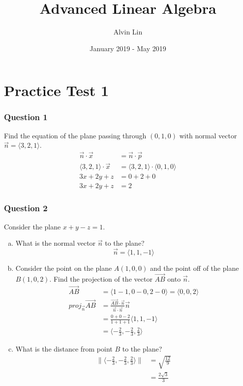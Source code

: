 \documentclass{math}
\title{Advanced Linear Algebra}
\author{Alvin Lin}
\date{January 2019 - May 2019}
\begin{document}
\maketitle

\section*{Practice Test 1}

\subsubsection*{Question 1}
Find the equation of the plane passing through \( (0, 1, 0) \) with normal
vector \( \vec{n} = \langle3,2,1\rangle \).
\begin{align*}
  \vec{n}\cdot\vec{x} &= \vec{n}\cdot\vec{p} \\
  \langle3,2,1\rangle\cdot\vec{x} &=
    \langle3,2,1\rangle\cdot\langle0,1,0\rangle \\
  3x+2y+z &= 0+2+0 \\
  3x+2y+z &= 2
\end{align*}

\subsubsection*{Question 2}
Consider the plane \( x+y-z = 1 \).
\begin{enumerate}[(a)]
  \item What is the normal vector \( \vec{n} \) to the plane?
  \[ \vec{n} = \langle1,1,-1\rangle \]
  \item Consider the point on the plane \( A(1,0,0) \) and the point off of the
    plane \( B(1,0,2) \). Find the projection of the vector
    \( \overrightarrow{AB} \) onto \( \vec{n} \).
  \begin{align*}
    \overrightarrow{AB} &= \langle1-1,0-0,2-0\rangle = \langle0,0,2\rangle \\
    proj_{\vec{n}}\overrightarrow{AB} &= \frac{\overrightarrow{AB}\cdot\vec{n}}
      {\vec{n}\cdot\vec{n}}\vec{n} \\
    &= \frac{0+0-2}{1+1+1}\langle1,1,-1\rangle \\
    &= \langle-\frac{2}{3},-\frac{2}{3},\frac{2}{3}\rangle
  \end{align*}
  \item What is the distance from point \( B \) to the plane?
  \begin{align*}
    \|\langle-\frac{2}{3},-\frac{2}{3},\frac{2}{3}\rangle\| &=
      \sqrt{\frac{12}{9}} \\
    &= \frac{2\sqrt{3}}{3}
  \end{align*}
\end{enumerate}
\end{document}
